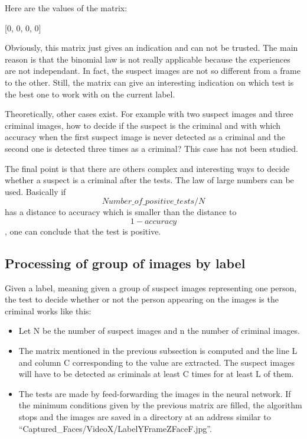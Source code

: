 Here are the values of the matrix:

[0, 0, 0, 0]\newline
[0, 0.9999999999999951, 0.9999999525689869, 0.9976629875412226]\newline
[0, 0.9999999999823158, 0.9999932742823311, 0.9700927023132484]\newline
[0, 0.9999999742413335, 0.9996171531778806, 0.839991448518568]\newline
[0, 0.9999812348061731, 0.9890255828765551, 0.533024434956926]\newline
[0, 0.9931600804077683, 0.8398962730338903, 0.1708882346261404]\newline

Obviously, this matrix just gives an indication and can not be trusted. The main reason is that the binomial law is not really applicable because the experiences are not independant. In fact, the suspect images are not so different from a frame to the other. Still, the matrix can give an interesting indication on which test is the best one to work with on the current label.

Theoretically, other cases exist. For example with two suspect images and three criminal images, how to decide if the suspect is the criminal and with which accuracy when the first suspect image is never detected as a criminal and the second one is detected three times as a criminal? This case has not been studied.

The final point is that there are others complex and interesting ways to decide whether a suspect is a criminal after the tests. The law of large numbers can be used. Basically if \[Number\_of\_positive\_tests / N \] has a distance to accuracy which is smaller than the distance to \[1-accuracy\], one can conclude that the test is positive.

\subsection{Processing of group of images by label}
Given a label, meaning given a group of suspect images representing one person, the test to decide whether or not the person appearing on the images is the criminal works like this:
\begin{itemize}
\item Let N be the number of suspect images and n the number of criminal images.
\item The matrix mentioned in the previous subsection is computed and the line L and column C corresponding to the value are extracted. The suspect images will have to be detected as criminals at least C times for at least L of them.
\item The tests are made by feed-forwarding the images in the neural network. If the minimum conditions given by the previous matrix are filled, the algorithm stops and the images are saved in a directory at an address similar to \enquote{Captured\_Faces/VideoX/LabelYFrameZFaceF.jpg}.
\end{itemize} 

